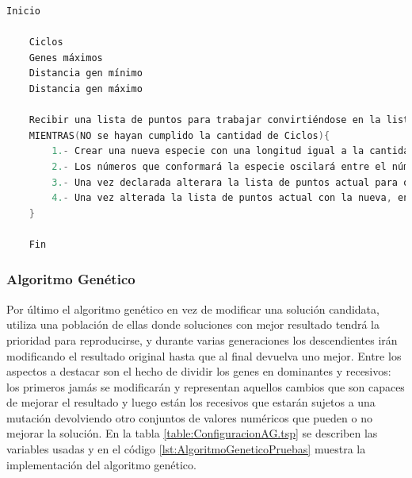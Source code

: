  

\begin{lstlisting}[language=C++, caption=Algoritmo greedy aplicado en las pruebas, label=lst:AlgoritmoGreedyPruebas]
    Inicio
    
    Ciclos
    Genes máximos
    Distancia gen mínimo
    Distancia gen máximo
    
    Recibir una lista de puntos para trabajar convirtiéndose en la lista de puntos actual.
    MIENTRAS(NO se hayan cumplido la cantidad de Ciclos){
    	1.- Crear una nueva especie con una longitud igual a la cantidad de genes máximos
    	2.- Los números que conformará la especie oscilará entre el número mínimo y máximo declarados anteriormente
    	3.- Una vez declarada alterara la lista de puntos actual para obtener una lista nueva.
    	4.- Una vez alterada la lista de puntos actual con la nueva, en caso de obtener un mejor resultado esta lista es sustituida por la nueva
    }
    
    Fin
\end{lstlisting}

\clearpage \newpage

\subsubsection{Algoritmo Genético}
Por último el algoritmo genético en vez de modificar una solución candidata, utiliza una población de ellas donde soluciones con mejor resultado tendrá la prioridad para reproducirse, y durante varias generaciones los descendientes irán modificando el resultado original hasta que al final devuelva uno mejor. Entre los aspectos a destacar son el hecho de dividir los genes en dominantes y recesivos: los primeros jamás se modificarán y representan aquellos cambios que son capaces de mejorar el resultado y luego están los recesivos que estarán sujetos a una mutación devolviendo otro conjuntos de valores numéricos que pueden o no mejorar la solución. En la tabla \ref{table:ConfiguracionAG.tsp} se describen las variables usadas y en el código \ref{lst:AlgoritmoGeneticoPruebas} muestra la implementación del algoritmo genético.



